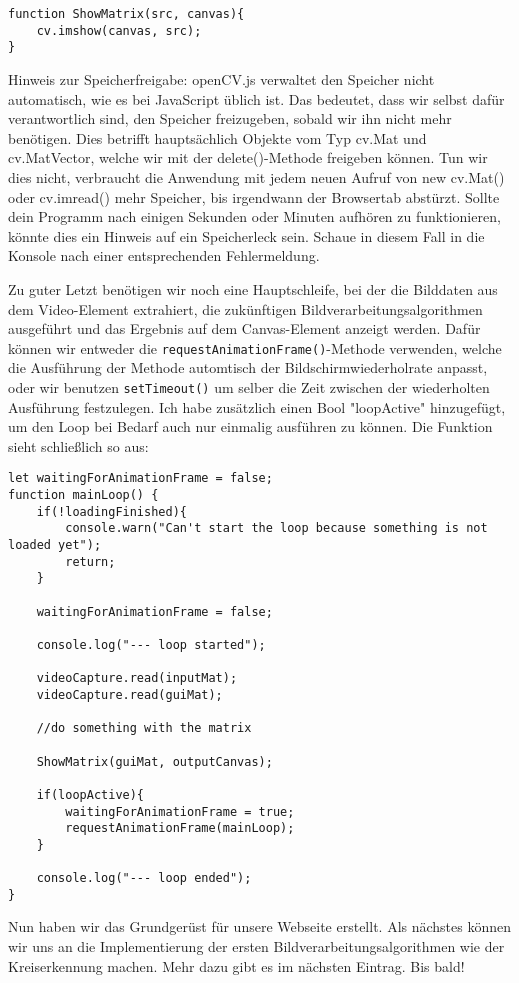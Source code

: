 \begin{lstlisting}[style=JavaScript]
function ShowMatrix(src, canvas){
    cv.imshow(canvas, src);
}
\end{lstlisting}

Hinweis zur Speicherfreigabe: openCV.js verwaltet den Speicher nicht automatisch, wie es bei JavaScript üblich ist. Das bedeutet, dass wir selbst dafür verantwortlich sind, den Speicher freizugeben, sobald wir ihn nicht mehr benötigen. Dies betrifft hauptsächlich Objekte vom Typ cv.Mat und cv.MatVector, welche wir mit der delete()-Methode freigeben können. Tun wir dies nicht, verbraucht die Anwendung mit jedem neuen Aufruf von new cv.Mat() oder cv.imread() mehr Speicher, bis irgendwann der Browsertab abstürzt. Sollte dein Programm nach einigen Sekunden oder Minuten aufhören zu funktionieren, könnte dies ein Hinweis auf ein Speicherleck sein. Schaue in diesem Fall in die Konsole nach einer entsprechenden Fehlermeldung.

Zu guter Letzt benötigen wir noch eine Hauptschleife, bei der die Bilddaten aus dem Video-Element extrahiert, die zukünftigen Bildverarbeitungsalgorithmen ausgeführt und das Ergebnis auf dem Canvas-Element anzeigt werden. Dafür können wir entweder die \texttt{requestAnimationFrame()}-Methode verwenden, welche die Ausführung der Methode automtisch der Bildschirmwiederholrate anpasst, oder wir benutzen \texttt{setTimeout()} um selber die Zeit zwischen der wiederholten Ausführung festzulegen. Ich habe zusätzlich einen Bool "loopActive" hinzugefügt, um den Loop bei Bedarf auch nur einmalig ausführen zu können. Die Funktion sieht schließlich so aus:

\begin{lstlisting}[style=JavaScript]
let waitingForAnimationFrame = false;
function mainLoop() {
    if(!loadingFinished){
        console.warn("Can't start the loop because something is not loaded yet");
        return;
    }

    waitingForAnimationFrame = false;

    console.log("--- loop started");

    videoCapture.read(inputMat);
    videoCapture.read(guiMat);

    //do something with the matrix
    
    ShowMatrix(guiMat, outputCanvas);

    if(loopActive){
        waitingForAnimationFrame = true;
        requestAnimationFrame(mainLoop);
    }

    console.log("--- loop ended");
}
\end{lstlisting}

Nun haben wir das Grundgerüst für unsere Webseite erstellt. Als nächstes können wir uns an die Implementierung der ersten Bildverarbeitungsalgorithmen wie der Kreiserkennung machen. Mehr dazu gibt es im nächsten Eintrag. Bis bald!
